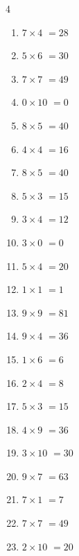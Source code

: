 \begin{multicols}{4}
\begin{enumerate}
  \item $7\times 4$
        $=28$

  \item $5\times 6$
        $=30$

  \item $7\times 7$
        $=49$

  \item $0\times 10$
        $=0$

  \item $8\times 5$
        $=40$

  \item $4\times 4$
        $=16$

  \item $8\times 5$
        $=40$

  \item $5\times 3$
        $=15$

  \item $3\times 4$
        $=12$

  \item $3\times 0$
        $=0$

  \item $5\times 4$
        $=20$

  \item $1\times 1$
        $=1$

  \item $9\times 9$
        $=81$

  \item $9\times 4$
        $=36$

  \item $1\times 6$
        $=6$

  \item $2\times 4$
        $=8$

  \item $5\times 3$
        $=15$

  \item $4\times 9$
        $=36$

  \item $3\times 10$
        $=30$

  \item $9\times 7$
        $=63$

  \item $7\times 1$
        $=7$

  \item $7\times 7$
        $=49$

  \item $2\times 10$
        $=20$


\end{enumerate}
\end{multicols}
